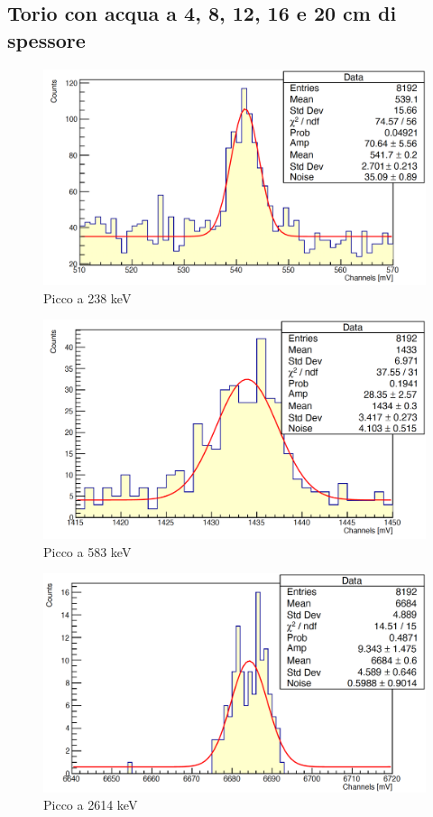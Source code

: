 \documentclass[a4paper,10pt]{article}
\begin{document}
\subsection{Torio con acqua a 4, 8, 12, 16 e 20 cm di spessore}
\begin{figure}[H]
    \centering
    \includegraphics[scale=0.45]{appendice/spettri/ThA1_4}
    \caption{Picco a 238 keV}
\end{figure}
\begin{figure}[H]
    \centering
    \includegraphics[scale=0.45]{appendice/spettri/ThA2_4}
    \caption{Picco a 583 keV}
\end{figure}
\begin{figure}[H]
    \centering
    \includegraphics[scale=0.45]{appendice/spettri/ThA3_4}
    \caption{Picco a 2614 keV}
\end{figure}
\end{document}
